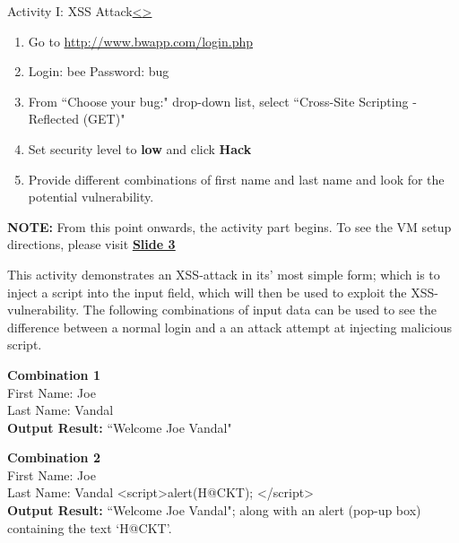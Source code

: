 \documentclass[12pt]{extarticle}
\newenvironment{instructionblock}{\Large\bgroup}{\egroup}
\begin{document}


\pagebreak
\begin{slide}{Activity I: XSS Attack}{\hyperref[slide 11]{\textless}\hyperref[slide 13]{\textgreater}}
	\begin{instructionblock}
		\begin{enumerate}
			\item Go to \url{http://www.bwapp.com/login.php}
			\item Login: bee      Password: bug
			\item From ``Choose your bug:" drop-down list, select ``Cross-Site Scripting - Reflected (GET)"
			\item Set security level to \textbf{low} and click \textbf{Hack}
			\item Provide different combinations of first name and last name and look for the potential vulnerability.
		\end{enumerate}
	\end{instructionblock}	
\end{slide}

\vspace{4mm}
\noindent 
\textbf{NOTE:} From this point onwards, the activity part begins. To see the VM setup directions, please visit \hyperref[slide 3]{\textbf{\underline{Slide 3}}}

\vspace{4mm}
\noindent
This activity demonstrates an XSS-attack in its' most simple form; which is to inject a script into the input field, which will then be used to exploit the XSS-vulnerability. The following combinations of input data can be used to see the difference between a normal login and a an attack attempt at injecting malicious script.

\vspace{4mm}
\noindent 
\textbf{Combination 1}\\
First Name: Joe\\
Last Name: Vandal\\
\textbf{Output Result:} ``Welcome Joe Vandal" 

\vspace{5mm}
\noindent 
\textbf{Combination 2}\\
First Name: Joe\\
Last Name: Vandal \textless script\textgreater alert(H@CKT); \textless/script\textgreater\\
\textbf{Output Result:} ``Welcome Joe Vandal"; along with an alert (pop-up box) containing the text `H@CKT'. 
\end{document}
